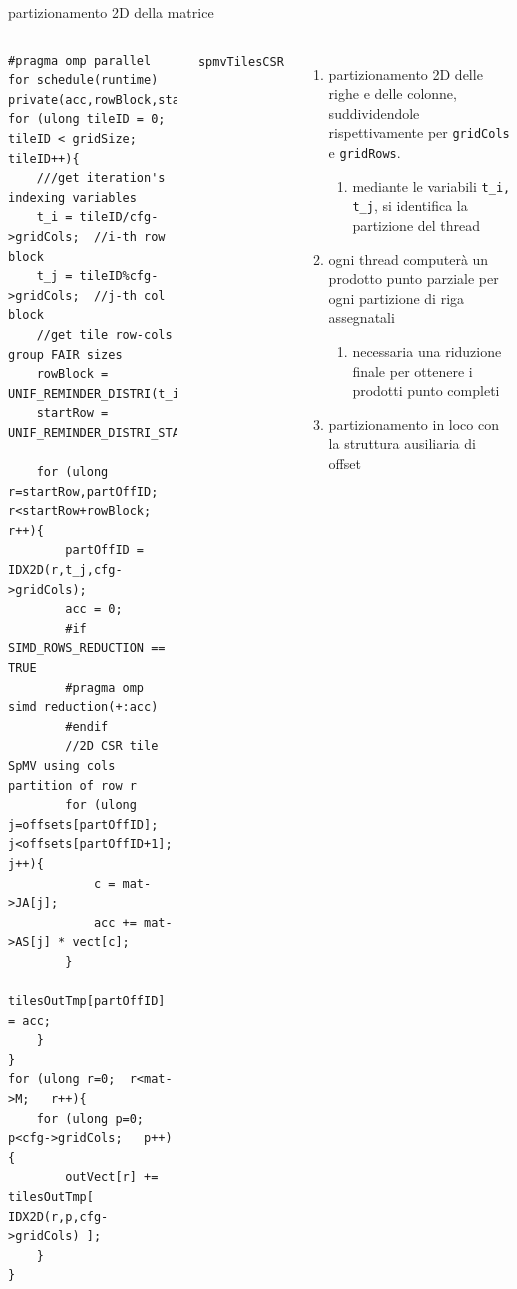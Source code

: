 \documentclass[aspectratio=1610]{beamer}
\newcommand{\vvv}[1]{{\small\texttt{#1}}}
\begin{document}
\begin{frame}[fragile]	{partizionamento 2D della matrice} 
	\begin{columns}
\begin{lstlisting}
#pragma omp parallel for schedule(runtime) private(acc,rowBlock,startRow,c,t_i,t_j)
for (ulong tileID = 0; tileID < gridSize; tileID++){
    ///get iteration's indexing variables
    t_i = tileID/cfg->gridCols;  //i-th row block
    t_j = tileID%cfg->gridCols;  //j-th col block
    //get tile row-cols group FAIR sizes
    rowBlock = UNIF_REMINDER_DISTRI(t_i,_rowBlock,_rowBlockRem); 
    startRow = UNIF_REMINDER_DISTRI_STARTIDX(t_i,_rowBlock,_rowBlockRem);

    for (ulong r=startRow,partOffID;  r<startRow+rowBlock;  r++){
        partOffID = IDX2D(r,t_j,cfg->gridCols);
        acc = 0;
        #if SIMD_ROWS_REDUCTION == TRUE
        #pragma omp simd reduction(+:acc)
        #endif
        //2D CSR tile SpMV using cols partition of row r
        for (ulong j=offsets[partOffID]; j<offsets[partOffID+1]; j++){
            c = mat->JA[j];
            acc += mat->AS[j] * vect[c]; 
        }
        tilesOutTmp[partOffID] = acc;
    }
}
for (ulong r=0;  r<mat->M;   r++){
    for (ulong p=0;   p<cfg->gridCols;   p++){
        outVect[r] += tilesOutTmp[ IDX2D(r,p,cfg->gridCols) ];
    }
}
\end{lstlisting}
			\vvv{spmvTilesCSR}\\
			\begin{enumerate}
				\item  
					partizionamento 2D delle righe e delle colonne, 
					suddividendole rispettivamente per \vvv{gridCols} e \vvv{gridRows}.\\ 
				\begin{enumerate}
					\item mediante le variabili \vvv{t\_i, t\_j}, si identifica la partizione del thread
				\end{enumerate}
				\pause
				\item  	ogni thread computerà un prodotto punto parziale 
						per ogni partizione di riga assegnatali
				\pause
				\begin{enumerate}
					\item necessaria una riduzione finale per ottenere i prodotti punto completi
				\end{enumerate}
				\pause
				\item  partizionamento in loco con la struttura ausiliaria di offset
			\end{enumerate}
	\end{columns}
\end{frame}
\end{document}
